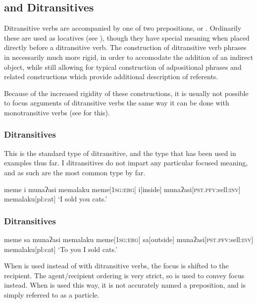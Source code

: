 \subsection{ and  Ditransitives}
Ditransitive verbs are accompanied by one of two prepositions,  or . Ordinarily these are used as locatives (see ), though they have special meaning when placed directly before a ditransitive verb. The construction of ditransitive verb phrases in necessarily much more rigid, in order to accomodate the addition of an indirect object, while still allowing for typical construction of adpositional phrases and related constructions which provide additional description of referents.

Because of the increased rigidity of these constructions, it is usually not possible to focus arguments of ditransitive verbs the same way it can be done with monotransitive verbs (see  for this).

\subsubsection{ Ditransitives}

This is the standard type of ditransitive, and the type that has been used in examples thus far. I ditransitives do not impart any particular focused meaning, and as such are the most common type by far.

\ex
\begingl
\glpreamble meme i munaʔasi memalaku
\endpreamble
meme[\textsc{1sg:erg}]
i[inside]
munaʔasi[\textsc{pst.pfv:}sell\textsc{:inv}]
memalaku[pl:cat]
\glft `I sold you cats.'
\endgl
\xe


\subsubsection{ Ditransitives}

\ex
\begingl
\glpreamble meme sa munaʔasi memalaku
\endpreamble
meme[\textsc{1sg:erg}]
sa[outside]
munaʔasi[\textsc{pst.pfv:}sell\textsc{:inv}]
memalaku[pl:cat]
\glft `To you I sold cats.'\footnotemark
\endgl
\xe


When  is used instead of  with ditransitive verbs, the focus is shifted to the recipient. The agent/recipient ordering is very strict, so  is used to convey focus instead. When  is used this way, it is not accurately named a preposition, and is simply referred to as a particle.

